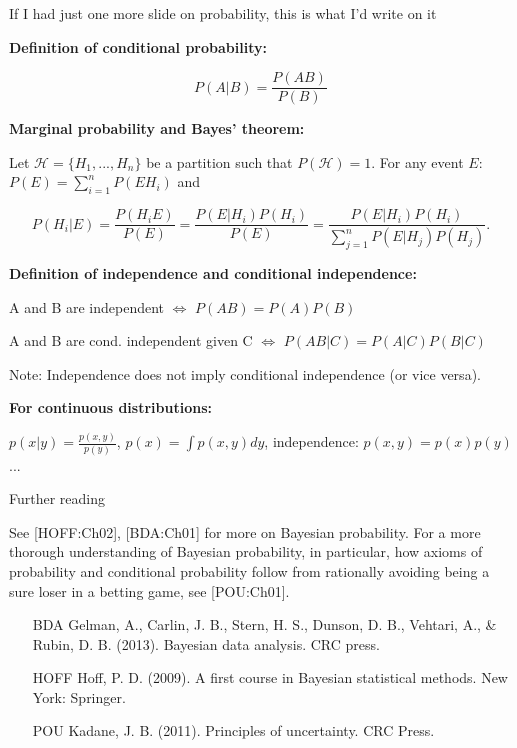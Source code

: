 \begin{frame}{\begin{large}If I had just one more slide on probability, this is what I'd write on it\end{large}}

\begin{scriptsize}

\textbf{Definition of conditional probability:}

$$ P(A|B) = \frac{P(AB)}{P(B)} $$

\textbf{Marginal probability and Bayes' theorem:}

Let $\mathcal{H} = \{H_1,..., H_n\}$ be a partition such that $P(\mathcal{H}) = 1$. For any event $E$: $P(E) = \sum_{i=1}^n P(E H_i)$ and

$$P(H_i | E) = \frac{P(H_iE)}{P(E)} = \frac{P(E | H_i)P(H_i)}{P(E)}=\frac{P(E | H_i)P(H_i)}{\sum_{j=1}^n P(E | H_j)P(H_j)}.$$

\textbf{Definition of independence and conditional independence:}

A and B are independent $\Leftrightarrow$ $P(AB) = P(A)P(B)$

A and B are cond. independent given C $\Leftrightarrow$ $P(AB|C) = P(A|C)P(B|C)$

Note: Independence does not imply conditional independence (or vice versa).

\smallskip

\textbf{For continuous distributions:}

$p(x|y) = \frac{p(x, y)}{p(y)}$, $p(x) = \int p(x, y) dy$, independence: $p(x,y) = p(x)p(y)$...


\end{scriptsize}

\end{frame}

\begin{frame}{Further reading}

See [HOFF:Ch02], [BDA:Ch01] for more on Bayesian probability. For a more thorough understanding of Bayesian probability, in particular, how axioms of probability and conditional probability follow from rationally avoiding being a sure loser in a betting game, see [POU:Ch01].

\bigskip

\begin{scriptsize}
\begin{itemize}
\item[BDA] Gelman, A., Carlin, J. B., Stern, H. S., Dunson, D. B., Vehtari, A., \& Rubin, D. B. (2013). Bayesian data analysis. CRC press.
\item[HOFF] Hoff, P. D. (2009). A first course in Bayesian statistical methods. New York: Springer.
\item [POU] Kadane, J. B. (2011). Principles of uncertainty. CRC Press.
\end{itemize}
\end{scriptsize}
\end{frame}


